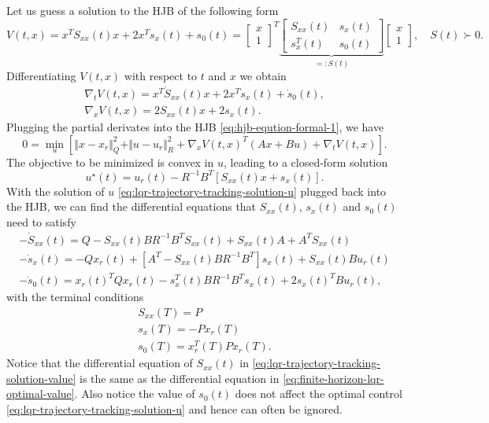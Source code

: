 \documentclass[
]{book}
\theoremstyle{definition}
\theoremstyle{definition}
\theoremstyle{definition}
\theoremstyle{definition}
\theoremstyle{remark}
\begin{document}
Let us guess a solution to the HJB of the following form
\[
V(t,x) = x^T S_{xx}(t) x + 2 x^T s_x(t) + s_0(t) = \begin{bmatrix} x \\ 1 \end{bmatrix}^T \underbrace{\begin{bmatrix} S_{xx}(t) & s_x(t) \\ s_x^T(t) & s_0(t) \end{bmatrix}}_{=: S(t)} \begin{bmatrix} x \\ 1 \end{bmatrix}, \quad S(t) \succ 0.
\]
Differentiating \(V(t,x)\) with respect to \(t\) and \(x\) we obtain
\begin{equation}
\begin{split}
\nabla_t V(t,x) = x^T \dot{S}_{xx}(t) x + 2 x^T \dot{s}_x(t) + \dot{s}_0(t), \\
\nabla_x V(t,x) = 2 S_{xx}(t) x + 2 s_x(t).
\end{split}
\end{equation}
Plugging the partial derivates into the HJB \eqref{eq:hjb-eqution-formal-1}, we have
\[
0 = \min_{u} \left[ \Vert x - x_r \Vert_Q^2 + \Vert u - u_r \Vert_R^2 +  \nabla_x V(t,x)^T (A x + Bu) + \nabla_t V(t,x) \right].
\]
The objective to be minimized is convex in \(u\), leading to a closed-form solution
\begin{equation}
u^{\star}(t) = u_r(t) - R^{-1}B^T \left[ S_{xx}(t)x + s_x(t) \right].
\label{eq:lqr-trajectory-tracking-solution-u}
\end{equation}
With the solution of \(u\) \eqref{eq:lqr-trajectory-tracking-solution-u} plugged back into the HJB, we can find the differential equations that \(S_{xx}(t)\), \(s_x(t)\) and \(s_0(t)\) need to satisfy
\begin{equation}
\begin{split}
-\dot{S}_{xx}(t) = Q - S_{xx}(t) B R^{-1} B^T S_{xx}(t) + S_{xx}(t)A + A^T S_{xx}(t) \\
- \dot{s}_x(t) = -Q x_r(t) + [A^T - S_{xx}(t)B R^{-1} B^T]s_x(t) + S_{xx}(t) B u_r(t) \\
- \dot{s}_0(t) = x_r(t)^T Q x_r(t) - s_x^T(t) B R^{-1} B^T s_x(t) + 2 s_x(t)^T B u_r(t),
\end{split}
\label{eq:lqr-trajectory-tracking-solution-value}
\end{equation}
with the terminal conditions
\begin{equation}
\begin{split}
S_{xx}(T) = P \\
s_x(T) = - P x_r(T) \\
s_0(T) = x_r^T(T) P x_r(T).
\end{split}
\end{equation}
Notice that the differential equation of \(S_{xx}(t)\) in \eqref{eq:lqr-trajectory-tracking-solution-value} is the same as the differential equation in \eqref{eq:finite-horizon-lqr-optimal-value}. Also notice the value of \(s_0(t)\) does not affect the optimal control \eqref{eq:lqr-trajectory-tracking-solution-u} and hence can often be ignored.
\end{document}
